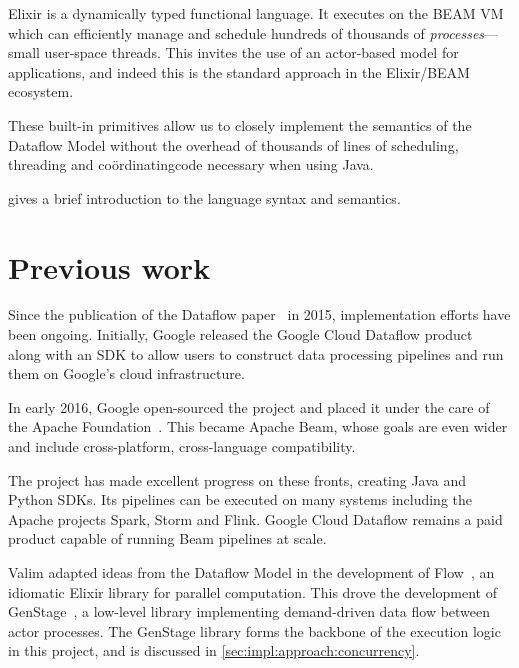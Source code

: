 Elixir is a dynamically typed functional language. 
It executes on the BEAM VM which can efficiently manage and schedule hundreds of thousands of \emph{processes}---small user-space threads.
This invites the use of an actor-based model for applications, and indeed this is the standard approach in the Elixir/BEAM ecosystem.

These built-in primitives allow us to closely implement the semantics of the Dataflow Model without the overhead of thousands of lines of scheduling, threading and co\"ordinating\footnotemark[1] code necessary when using Java.


 gives a brief introduction to the language syntax and semantics.

\section{Previous work}\label{sec:intro:previous}
Since the publication of the Dataflow paper~\cite{Akidau:2015} in 2015, implementation efforts have been ongoing.
Initially, Google released the Google Cloud Dataflow product~\cite{CloudDataflow} along with an SDK to allow users to construct data processing pipelines and run them on Google's cloud infrastructure.

In early 2016, Google open-sourced the project and placed it under the care of the Apache Foundation~\cite{ApacheDataflowPost}.
This became Apache Beam, whose goals are even wider and include cross-platform, cross-language compatibility.

The project has made excellent progress on these fronts, creating Java and Python SDKs.
Its pipelines can be executed on many systems including the Apache projects Spark, Storm and Flink.
Google Cloud Dataflow remains a paid product capable of running Beam pipelines at scale.

Valim adapted ideas from the Dataflow Model in the development of Flow~\cite{ElixirFlow}, an idiomatic Elixir library for parallel computation.
This drove the development of GenStage~\cite{ElixirGenStage}, a low-level library implementing demand-driven data flow between actor processes.
The GenStage library forms the backbone of the execution logic in this project, and is discussed in \cref{sec:impl:approach:concurrency}.

